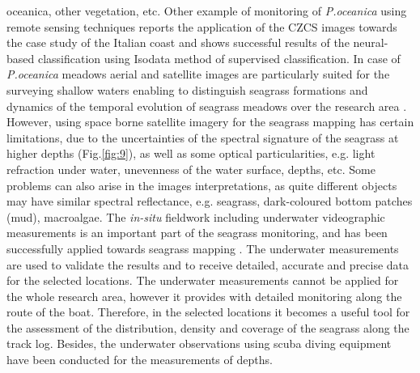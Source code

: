 \documentclass[10pt, a4paper]{article}
\begin{document}
oceanica, other vegetation, etc.
Other example of monitoring of \textit{P.oceanica} using remote sensing techniques \cite{Calvo03}\label{Calvo03}
reports the application of the CZCS images towards the case study of the Italian coast and shows
successful results of the neural-based classification using Isodata method of supervised classification.
In case of \textit{P.oceanica} meadows aerial and satellite images are particularly suited for the surveying
shallow waters \cite{Pasqualini98b}\label{Pasqualini98b} enabling to distinguish seagrass formations and dynamics of
the temporal evolution of seagrass meadows over the research area \cite{Pasqualini01}\label{Pasqualini01}.
However, using space borne satellite imagery for the seagrass mapping has certain limitations, due to
the uncertainties of the spectral signature of the seagrass at higher depths  (Fig.\ref{fig:9}), as well as some
optical particularities, e.g. light refraction under water, unevenness of the water surface, depths, etc.
Some problems can also arise in the images interpretations, as quite different objects may have
similar spectral reflectance, e.g. seagrass, dark-coloured bottom patches (mud), macroalgae.
The \textit{in-situ} fieldwork including underwater videographic measurements is an important part of the
seagrass monitoring, and has been successfully applied towards seagrass mapping \cite{Haag08}\label{Haag08}.
The underwater measurements are used to validate the results and to receive detailed, accurate and
precise data for the selected locations. The underwater measurements cannot be applied for the whole
research area, however it provides with detailed monitoring along the route of the boat. Therefore, in
the selected locations it becomes a useful tool for the assessment of the distribution, density and
coverage of the seagrass along the track log. Besides, the underwater observations using scuba diving
equipment have been conducted for the measurements of depths.
\end{document}
